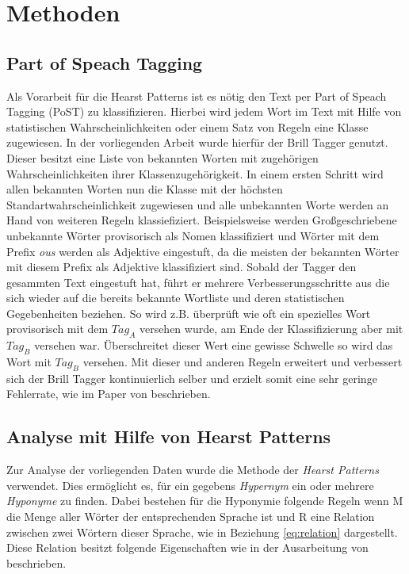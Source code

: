\section{Methoden}
\subsection{Part of Speach Tagging}
Als Vorarbeit für die Hearst Patterns ist es nötig den Text per Part of Speach Tagging (PoST) zu klassifizieren.
Hierbei wird jedem Wort im Text mit Hilfe von statistischen Wahrscheinlichkeiten oder einem Satz von Regeln eine Klasse zugewiesen.
In der vorliegenden Arbeit wurde hierfür der Brill Tagger genutzt. Dieser besitzt eine Liste von bekannten Worten mit zugehörigen
Wahrscheinlichkeiten ihrer Klassenzugehörigkeit. In einem ersten Schritt wird allen bekannten Worten nun die Klasse mit der höchsten
Standartwahrscheinlichkeit zugewiesen und alle unbekannten Worte werden an Hand von weiteren Regeln klassiefiziert. Beispielsweise werden Großgeschriebene 
unbekannte Wörter provisorisch als Nomen klassifiziert und Wörter mit dem Prefix \textit{ous} werden als Adjektive eingestuft,
da die meisten der bekannten Wörter mit diesem Prefix als Adjektive klassifiziert sind. Sobald der Tagger den gesammten Text eingestuft hat, führt er
mehrere Verbesserungsschritte aus die sich wieder auf die bereits bekannte Wortliste und deren statistischen Gegebenheiten beziehen. So wird z.B. 
überprüft wie oft ein spezielles Wort provisorisch mit dem $Tag_{A}$ versehen wurde, am Ende der Klassifizierung aber mit $Tag_{B}$ versehen war. 
Überschreitet dieser Wert eine gewisse Schwelle so wird das Wort mit $Tag_{B}$ versehen. Mit dieser und anderen Regeln erweitert und verbessert sich der
Brill Tagger kontinuierlich selber und erzielt somit eine sehr geringe Fehlerrate, wie im Paper von  beschrieben.

\subsection{Analyse mit Hilfe von Hearst Patterns}

Zur Analyse der vorliegenden Daten wurde die Methode der \textit{Hearst Patterns} verwendet. 
Dies ermöglicht es, für ein gegebens \textit{Hypernym} ein oder mehrere \textit{Hyponyme} zu finden. 
Dabei bestehen für die Hyponymie folgende Regeln wenn M die Menge aller Wörter der 
entsprechenden Sprache ist und R eine Relation zwischen zwei Wörtern dieser Sprache, wie in Beziehung \ref{eq:relation} dargestellt.
Diese Relation besitzt folgende Eigenschaften wie in der Ausarbeitung von \cite{bib:Snow2004} beschrieben.

